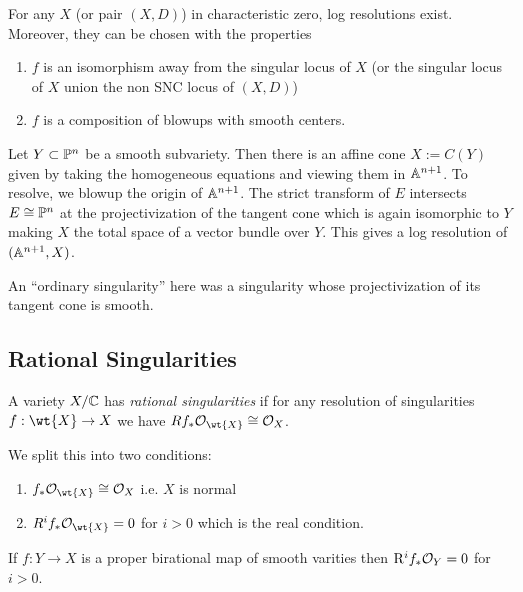 \documentclass[12pt]{article}
\newcommand{\R}{\mathrm{R}}
\begin{document}
\begin{theorem}[Hironaka]
For any $X$ (or pair $(X, D)$) in characteristic zero, log resolutions exist. Moreover, they can be chosen with the properties
\begin{enumerate}
\item $f$ is an isomorphism away from the singular locus of $X$ (or the singular locus of $X$ union the non SNC locus of $(X, D)$)
\item $f$ is a composition of blowups with smooth centers.
\end{enumerate}
\end{theorem}

\begin{example}
Let $Y \subset \P^n$ be a smooth subvariety. Then there is an affine cone $X := C(Y)$ given by taking the homogeneous equations and viewing them in $\A^{n+1}$. To resolve, we blowup the origin of $\A^{n+1}$. The strict transform of $E$ intersects $E \cong \P^n$ at the projectivization of the tangent cone which is again isomorphic to $Y$ making $X$ the total space of a vector bundle over $Y$. This gives a log resolution of $(\A^{n+1}, X)$. 
\end{example}

\begin{rmk}
An ``ordinary singularity'' here was a singularity whose projectivization of its tangent cone is smooth.
\end{rmk}
 
\subsection{Rational Singularities}

\begin{defn}
A variety $X / \CC$ has \textit{rational singularities} if for any resolution of singularities $f : \wt{X} \to X$ we have $R f_* \struct{\wt{X}} \cong \struct{X}$.
\end{defn}

\begin{rmk}
We split this into two conditions:
\begin{enumerate}
\item $f_* \struct{\wt{X}} \cong \struct{X}$ i.e. $X$ is normal
\item $R^i f_* \struct{\wt{X}} = 0$ for $i > 0$ which is the real condition. 
\end{enumerate}
\end{rmk}

\begin{exercise}
If $f : Y \to X$ is a proper birational map of smooth varities then $\R^i f_* \struct{Y} = 0$ for $i > 0$. 
\end{exercise}
\end{document}
